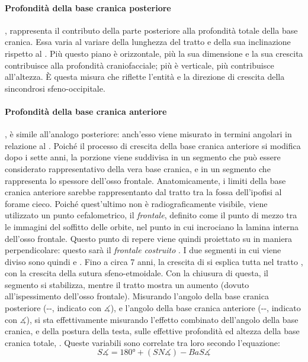 \paragraph{Profondità della base cranica posteriore} , rappresenta il contributo della parte posteriore alla profondità totale della base cranica. Essa varia al variare della lunghezza del tratto  e della sua inclinazione rispetto al . Più questo piano è orizzontale, più la sua dimensione e la sua crescita contribuisce alla profondità craniofacciale; più è verticale, più contribuisce all'altezza. È questa misura che riflette l'entità e la direzione di crescita della sincondrosi sfeno-occipitale.

\paragraph{Profondità della base cranica anteriore} , è simile all'analogo posteriore: anch'esso viene misurato in termini angolari in relazione al . Poiché il processo di crescita della base cranica anteriore si modifica dopo i sette anni, la porzione  viene suddivisa in un segmento che può essere considerato rappresentativo della vera base cranica, e in un segmento che rappresenta lo spessore dell'osso frontale. Anatomicamente, i limiti della base cranica anteriore sarebbe rappresentanto dal tratto tra la fossa dell'ipofisi al forame cieco. Poiché quest'ultimo non è radiograficamente visibile, viene utilizzato un punto cefalometrico, il \emph{frontale}, definito come il punto di mezzo tra le immagini del soffitto delle orbite, nel punto in cui incrociano la lamina interna dell'osso frontale. Questo punto di repere viene quindi proiettato su  in maniera perpendicolare: questo sarà il \emph{frontale costruito} . I due segmenti in cui viene diviso  sono quindi  e . Fino a circa 7 anni, la crescita di  si esplica tutta nel tratto , con la crescita della sutura sfeno-etmoidale. Con la chiusura di questa, il segmento  si stabilizza, mentre il tratto  mostra un aumento (dovuto all'ispessimento dell'osso frontale). Misurando l'angolo della base cranica posteriore (--, indicato con $\measuredangle$), e l'angolo della base cranica anteriore (--, indicato con $\measuredangle$), si sta effettivamente misurando l'effetto combinato dell'angolo della base cranica, e della postura della testa, sulle effettive profondità ed altezza della base cranica totale, . Queste variabili sono correlate tra loro secondo l'equazione:
\begin{equation}
S\measuredangle = 180° + (SN\measuredangle) - BaS\measuredangle
\end{equation}

